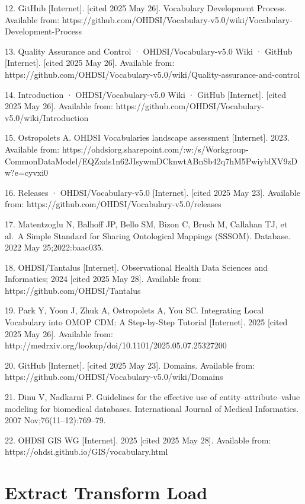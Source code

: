 \documentclass[
  letterpaper,
  paper=7in:10in,
  pagesize=pdftex,
  headinclude=on,
  footinclude=on,
  12pt]{scrbook}
\begin{document}
12. GitHub {[}Internet{]}. {[}cited 2025 May 26{]}. Vocabulary
Development Process. Available from:
https://github.com/OHDSI/Vocabulary-v5.0/wiki/Vocabulary-Development-Process

13. Quality Assurance and Control · OHDSI/Vocabulary-v5.0 Wiki · GitHub
{[}Internet{]}. {[}cited 2025 May 26{]}. Available from:
https://github.com/OHDSI/Vocabulary-v5.0/wiki/Quality-assurance-and-control

14. Introduction · OHDSI/Vocabulary-v5.0 Wiki · GitHub {[}Internet{]}.
{[}cited 2025 May 26{]}. Available from:
https://github.com/OHDSI/Vocabulary-v5.0/wiki/Introduction

15. Ostropolets A. OHDSI Vocabularies landscape assessment
{[}Internet{]}. 2023. Available from:
https://ohdsiorg.sharepoint.com/:w:/s/Workgroup-CommonDataModel/EQZxds1n62JIsywmDCknwtABnSb42q7hM5PwiyblXV9zDw?e=cyvxi0

16. Releases · OHDSI/Vocabulary-v5.0 {[}Internet{]}. {[}cited 2025 May
23{]}. Available from: https://github.com/OHDSI/Vocabulary-v5.0/releases

17. Matentzoglu N, Balhoff JP, Bello SM, Bizon C, Brush M, Callahan TJ,
et al.~A Simple Standard for Sharing Ontological Mappings (SSSOM).
Database. 2022 May 25;2022:baac035.

18. OHDSI/Tantalus {[}Internet{]}. Observational Health Data Sciences
and Informatics; 2024 {[}cited 2025 May 28{]}. Available from:
https://github.com/OHDSI/Tantalus

19. Park Y, Yoon J, Zhuk A, Ostropolets A, You SC. Integrating Local
Vocabulary into OMOP CDM: A Step-by-Step Tutorial {[}Internet{]}. 2025
{[}cited 2025 May 26{]}. Available from:
http://medrxiv.org/lookup/doi/10.1101/2025.05.07.25327200

20. GitHub {[}Internet{]}. {[}cited 2025 May 23{]}. Domains. Available
from: https://github.com/OHDSI/Vocabulary-v5.0/wiki/Domains

21. Dinu V, Nadkarni P. Guidelines for the effective use of
entity--attribute--value modeling for biomedical databases.
International Journal of Medical Informatics. 2007
Nov;76(11--12):769--79.

22. OHDSI GIS WG {[}Internet{]}. 2025 {[}cited 2025 May 28{]}. Available
from: https://ohdsi.github.io/GIS/vocabulary.html

\chapter{Extract Transform Load}\label{sec-representation-etl}
\end{document}
